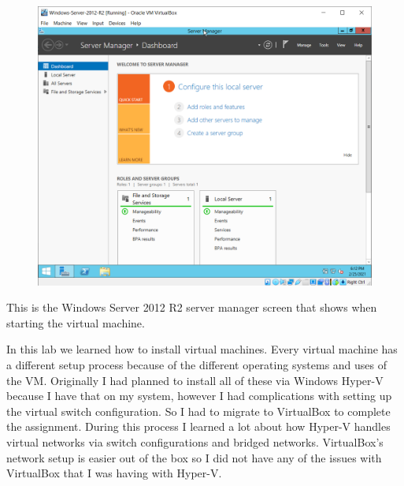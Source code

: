 \begin{figure}[H]
    \centering
    \includegraphics[width=\linewidth]{figures/Windows-2012-Home.png}
\end{figure}
This is the Windows Server 2012 R2 server manager screen that shows when starting the virtual machine.

In this lab we learned how to install virtual machines.
Every virtual machine has a different setup process because of the different operating systems and uses of the VM.
Originally I had planned to install all of these via Windows Hyper-V because I have that on my system, however I had complications with setting up the virtual switch configuration.
So I had to migrate to VirtualBox to complete the assignment.
During this process I learned a lot about how Hyper-V handles virtual networks via switch configurations and bridged networks.
VirtualBox's network setup is easier out of the box so I did not have any of the issues with VirtualBox that I was having with Hyper-V.